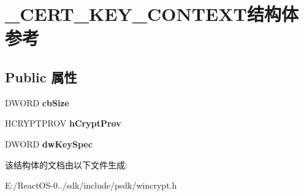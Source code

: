 \hypertarget{struct___c_e_r_t___k_e_y___c_o_n_t_e_x_t}{}\section{\+\_\+\+C\+E\+R\+T\+\_\+\+K\+E\+Y\+\_\+\+C\+O\+N\+T\+E\+X\+T结构体 参考}
\label{struct___c_e_r_t___k_e_y___c_o_n_t_e_x_t}
\subsection*{Public 属性}
\begin{DoxyCompactItemize}
\item 
\mbox{\label{struct___c_e_r_t___k_e_y___c_o_n_t_e_x_t_add79f9daf82cb16a2136633a7b4fb079}} 
D\+W\+O\+RD {\bfseries cb\+Size}
\item 
\mbox{\label{struct___c_e_r_t___k_e_y___c_o_n_t_e_x_t_a35c5a8feb9e44d53d48e61e883a30fe6}} 
H\+C\+R\+Y\+P\+T\+P\+R\+OV {\bfseries h\+Crypt\+Prov}
\item 
\mbox{\label{struct___c_e_r_t___k_e_y___c_o_n_t_e_x_t_a5299f305bf56a9eeb6e870b8e32737ec}} 
D\+W\+O\+RD {\bfseries dw\+Key\+Spec}
\end{DoxyCompactItemize}


该结构体的文档由以下文件生成\+:\begin{DoxyCompactItemize}
\item 
E\+:/\+React\+O\+S-\/0../sdk/include/psdk/wincrypt.\+h\end{DoxyCompactItemize}

